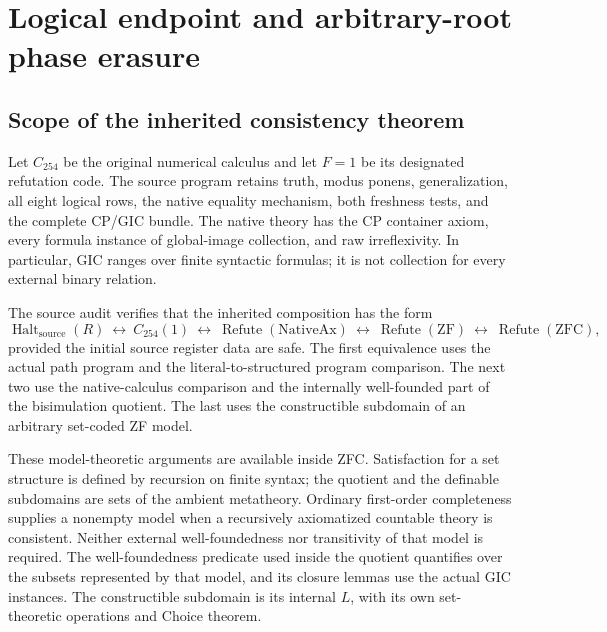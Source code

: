 \section{Logical endpoint and arbitrary-root phase erasure}
\label{sec:logical-audit}

\subsection{Scope of the inherited consistency theorem}

Let $C_{254}$ be the original numerical calculus and let $F=1$ be its
designated refutation code.  The source program retains truth, modus ponens,
generalization, all eight logical rows, the native equality mechanism,
both freshness tests, and the complete CP/GIC bundle.  The native theory
has the CP container axiom, every formula instance of global-image
collection, and raw irreflexivity.  In particular, GIC ranges over finite
syntactic formulas; it is not collection for every external binary relation.

The source audit verifies that the inherited composition has the form
\[
 \operatorname{Halt}_{\mathrm{source}}(R)
 \ \longleftrightarrow\ C_{254}(1)
 \ \longleftrightarrow\ \operatorname{Refute}(\mathrm{NativeAx})
 \ \longleftrightarrow\ \operatorname{Refute}(\mathrm{ZF})
 \ \longleftrightarrow\ \operatorname{Refute}(\mathrm{ZFC}),
\]
provided the initial source register data are safe.  The first equivalence
uses the actual path program and the literal-to-structured program
comparison.  The next two use the native-calculus comparison and the
internally well-founded part of the bisimulation quotient.  The last uses
the constructible subdomain of an arbitrary set-coded ZF model.

These model-theoretic arguments are available inside ZFC.  Satisfaction for
a set structure is defined by recursion on finite syntax; the quotient and
the definable subdomains are sets of the ambient metatheory.  Ordinary
first-order completeness supplies a nonempty model when a recursively
axiomatized countable theory is consistent.  Neither external
well-foundedness nor transitivity of that model is required.  The
well-foundedness predicate used inside the quotient quantifies over the
subsets represented by that model, and its closure lemmas use the actual
GIC instances.  The constructible subdomain is its internal $L$, with its
own set-theoretic operations and Choice theorem.

